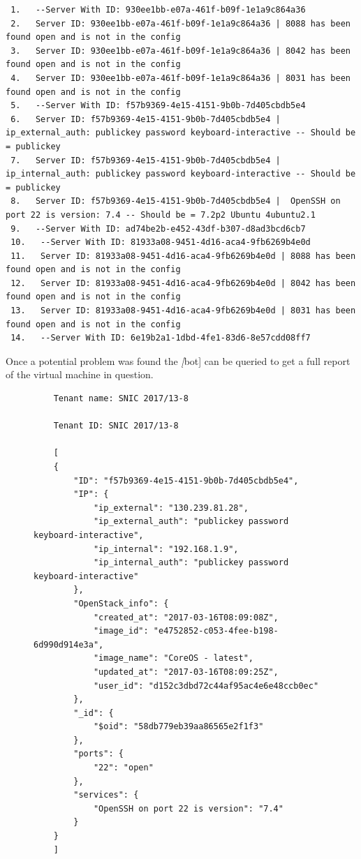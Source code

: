 \documentclass[12pt]{article}
\begin{document}
\begin{mdframed}
\begin{lstlisting}
 1.   --Server With ID: 930ee1bb-e07a-461f-b09f-1e1a9c864a36
 2.   Server ID: 930ee1bb-e07a-461f-b09f-1e1a9c864a36 | 8088 has been found open and is not in the config
 3.   Server ID: 930ee1bb-e07a-461f-b09f-1e1a9c864a36 | 8042 has been found open and is not in the config
 4.   Server ID: 930ee1bb-e07a-461f-b09f-1e1a9c864a36 | 8031 has been found open and is not in the config
 5.   --Server With ID: f57b9369-4e15-4151-9b0b-7d405cbdb5e4
 6.   Server ID: f57b9369-4e15-4151-9b0b-7d405cbdb5e4 |  ip_external_auth: publickey password keyboard-interactive -- Should be = publickey
 7.   Server ID: f57b9369-4e15-4151-9b0b-7d405cbdb5e4 |  ip_internal_auth: publickey password keyboard-interactive -- Should be = publickey
 8.   Server ID: f57b9369-4e15-4151-9b0b-7d405cbdb5e4 |  OpenSSH on port 22 is version: 7.4 -- Should be = 7.2p2 Ubuntu 4ubuntu2.1
 9.   --Server With ID: ad74be2b-e452-43df-b307-d8ad3bcd6cb7
 10.   --Server With ID: 81933a08-9451-4d16-aca4-9fb6269b4e0d
 11.   Server ID: 81933a08-9451-4d16-aca4-9fb6269b4e0d | 8088 has been found open and is not in the config
 12.   Server ID: 81933a08-9451-4d16-aca4-9fb6269b4e0d | 8042 has been found open and is not in the config
 13.   Server ID: 81933a08-9451-4d16-aca4-9fb6269b4e0d | 8031 has been found open and is not in the config
 14.   --Server With ID: 6e19b2a1-1dbd-4fe1-83d6-8e57cdd08ff7
\end{lstlisting}
\end{mdframed}

Once a potential problem was found the \emph[bot] can be queried to get a full report of the virtual machine in question.

\begin{figure}
\begin{mdframed}
\begin{lstlisting}
    Tenant name: SNIC 2017/13-8

    Tenant ID: SNIC 2017/13-8

    [
    {
        "ID": "f57b9369-4e15-4151-9b0b-7d405cbdb5e4",
        "IP": {
            "ip_external": "130.239.81.28",
            "ip_external_auth": "publickey password keyboard-interactive",
            "ip_internal": "192.168.1.9",
            "ip_internal_auth": "publickey password keyboard-interactive"
        },
        "OpenStack_info": {
            "created_at": "2017-03-16T08:09:08Z",
            "image_id": "e4752852-c053-4fee-b198-6d990d914e3a",
            "image_name": "CoreOS - latest",
            "updated_at": "2017-03-16T08:09:25Z",
            "user_id": "d152c3dbd72c44af95ac4e6e48ccb0ec"
        },
        "_id": {
            "$oid": "58db779eb39aa86565e2f1f3"
        },
        "ports": {
            "22": "open"
        },
        "services": {
            "OpenSSH on port 22 is version": "7.4"
        }
    }
    ]
\end{lstlisting}
\end{mdframed}
\end{figure}
\end{document}
